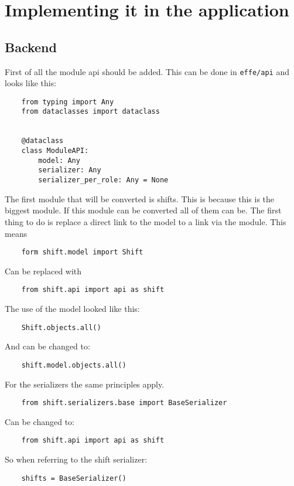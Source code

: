 \section{Implementing it in the application}

\subsection{Backend}

First of all the module api should be added. This can be done in \texttt{effe/api} and looks like this:
\begin{verbatim}
    from typing import Any
    from dataclasses import dataclass


    @dataclass
    class ModuleAPI:
        model: Any
        serializer: Any
        serializer_per_role: Any = None
\end{verbatim}

The first module that will be converted is shifts. This is because this is the biggest module. If this module can be converted all of them can be. The first thing to do is replace a direct link to the model to a link via the module. This means
\begin{verbatim}
    form shift.model import Shift
\end{verbatim}

Can be replaced with
\begin{verbatim}
    from shift.api import api as shift
\end{verbatim}

The use of the model looked like this:
\begin{verbatim}
    Shift.objects.all()
\end{verbatim}

And can be changed to:
\begin{verbatim}
    shift.model.objects.all()
\end{verbatim}

For the serializers the same principles apply.
\begin{verbatim}
    from shift.serializers.base import BaseSerializer
\end{verbatim}

Can be changed to:
\begin{verbatim}
    from shift.api import api as shift
\end{verbatim}

So when referring to the shift serializer:
\begin{verbatim}
    shifts = BaseSerializer()
\end{verbatim}

